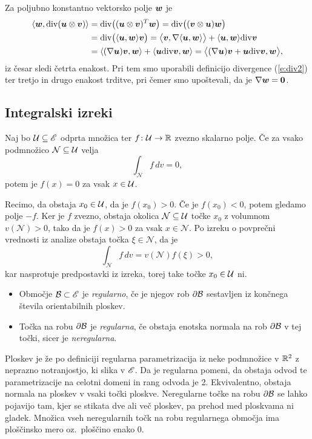 	Za poljubno konstantno vektorsko polje $\boldsymbol w$ je
	\begin{align*}
		\langle\boldsymbol w,\mathrm{div}(\boldsymbol u\otimes\boldsymbol v)\rangle&=\mathrm{div}\big((\boldsymbol u\otimes\boldsymbol v)^T\boldsymbol w\big)=
		\mathrm{div}\big((\boldsymbol v\otimes\boldsymbol u)\boldsymbol w\big)\\
		&=\mathrm{div}\big(\langle\boldsymbol u,\boldsymbol w\rangle\boldsymbol v\big)
		=\big<\boldsymbol v,\nabla\langle\boldsymbol u,\boldsymbol w\rangle\big>+\langle\boldsymbol u,\boldsymbol w\rangle\mathrm{div}\boldsymbol v\\
		&=\langle(\nabla\boldsymbol u)\boldsymbol v,\boldsymbol w\rangle+\langle\boldsymbol u\mathrm{div}\boldsymbol v,\boldsymbol w\rangle
		=\big<(\nabla\boldsymbol u)\boldsymbol v+\boldsymbol u\mathrm{div}\boldsymbol v,\boldsymbol w\big>,
	\end{align*}
	iz česar sledi četrta enakost. Pri tem smo uporabili definicijo divergence (\ref{e:div2}) ter
	tretjo in drugo enakost trditve, pri čemer smo upoštevali, da je $\nabla\boldsymbol w=\mathbf 0$.
\endproof


\subsection{Integralski izreki}


\begin{trditev}\label{t:oiz}
	Naj bo $\mathcal U\subseteq\mathscr E$ odprta množica ter $f\colon \mathcal U\to \mathbb R$ zvezno skalarno polje.
	Če za vsako podmnožico $\mathcal{N}\subseteq \mathcal U$ velja
	\[ \int_{\mathcal{N}} f\,dv=0, \]
	potem je $f(x)=0$ za vsak $x\in \mathcal U$.
\end{trditev}
\proof
	Recimo, da obstaja $x_0\in \mathcal U$, da je $f(x_0)> 0$. Če je $f(x_0)< 0$, potem gledamo polje $-f$.
	Ker je $f$ zvezno, obstaja okolica $\mathcal{N}\subseteq \mathcal U$ točke $x_0$ z volumnom $v(\mathcal{N})>0$, tako da je $f(x)>0$
	za vsak $x\in \mathcal{N}$. Po izreku o povprečni vrednosti iz analize obstaja točka $\xi\in \mathcal{N}$, da je
	\[ \int_{\mathcal{N}}f\,dv=v(\mathcal{N})f(\xi)> 0, \]
	kar nasprotuje predpostavki iz izreka, torej take točke $x_0\in \mathcal U$ ni.
\endproof

\begin{definicija}
	\begin{itemize}
		\item
		Območje $\mathcal B\subset\mathscr E$ je \emph{regularno}, če je njegov rob $\partial \mathcal B$ sestavljen
		iz končnega števila orientabilnih ploskev.
		\item
		Točka na robu $\partial\mathcal B$ je \emph{regularna}, če obstaja enotska normala
		na rob $\partial\mathcal B$ v tej točki, sicer je \emph{neregularna}.
	\end{itemize}
\end{definicija}
Ploskev je že po definiciji regularna parametrizacija iz neke podmnožice v $\mathbb R^2$ z neprazno notranjostjo,
ki slika v $\mathscr E$. Da je regularna pomeni, da obstaja odvod te parametrizacije na celotni domeni in
rang odvoda je 2. Ekvivalentno, obstaja normala na ploskev v vsaki točki ploskve.
Neregularne točke na robu $\partial\mathcal B$ se lahko pojavijo tam, kjer se stikata dve ali več ploskev,
pa prehod med ploskvama ni gladek.
Množica vseh neregularnih točk na robu regularnega območja ima ploščinsko mero oz.~ploščino enako 0.


